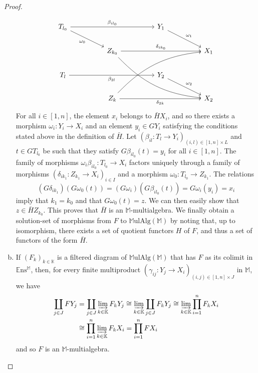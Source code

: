 \documentclass{article}
\newcommand{\bb}[1]{{\mathbb{#1}}}
\newcommand{\Set}{\mathbb{E}\mathrm{ns}}
\newcommand{\MulAlg}{\mathbb{M}\mathrm{ulAlg}}
\newcommand{\oldpage}[1]{\marginpar{\footnotesize$\Big\vert$ \textit{p.~#1}}}
\begin{document}
\begin{proof}
\begin{enumerate}[a)]
\oldpage{198}
      \[
        \begin{tikzcd}[column sep=huge]
          T_{l_0} \ar[rr,"\beta_{il_0}"] \ar[dr,swap,"\omega_0"]
          && Y_1 \ar[dr,"\omega_1"]
        \\&Z_{k_0} \ar[rr,"\delta_{ik_0}"] \ar[ddrr,bend right=20]
          && X_1
        \\T_l \ar[rr,swap,"\beta_{2l}"]
          && Y_2 \ar[dr,"\omega_2"]
        \\&Z_k \ar[rr,swap,"\delta_{2k}"] \ar[uurr,bend left=20]
          && X_2
        \end{tikzcd}
      \]
      For all $i\in[1,n]$, the element $x_i$ belongs to $\bar{H}X_i$, and so there exists a morphism $\omega_i\colon Y_i\to X_i$ and an element $y_i\in GY_i$ satisfying the conditions stated above in the definition of $\bar{H}$.
      Let $(\beta_{il}\colon T_l\to Y_i)_{(i,l)\in[1,n]\times L}$ and $t\in GT_{l_0}$ be such that they satisfy $G\beta_{il_0}(t)=y_i$ for all $i\in[1,n]$.
      The family of morphisms $\omega_i\beta_{il_0}\colon T_{l_0}\to X_i$ factors uniquely through a family of morphisms $(\delta_{ik_1}\colon Z_{k_1}\to X_i)_{i\in I}$ and a morphism $\omega_0\colon T_{l_0}\to Z_{k_1}$.
      The relations
      \[
        (G\delta_{ik_1})(G\omega_0(t))
        = (G\omega_i)(G\beta_{il_0}(t))
        = G\omega_i(y_i)
        = x_i
      \]
      imply that $k_1=k_0$ and that $G\omega_0(t)=z$.
      We can then easily show that $z\in\bar{H}Z_{k_0}$.
      This proves that $\bar{H}$ is an $\bb{M}$-multialgebra.
      We finally obtain a solution-set of morphisms from $F$ to $\MulAlg(\bb{M})$ by noting that, up to isomorphism, there exists a set of quotient functors $H$ of $F$, and thus a set of functors of the form $\bar{H}$.
    \item If $(F_k)_{k\in\bb{K}}$ is a filtered diagram of $\MulAlg(\bb{M})$ that has $F$ as its colimit in $\Set^\bb{M}$, then, for every finite multiproduct $(\gamma_{ij}\colon Y_j\to X_i)_{(i,j)\in[1,n]\times J}$ in $\bb{M}$, we have
      \[
        \begin{aligned}
          \coprod_{j\in J} FY_j
          &= \coprod_{j\in J} \varinjlim_{k\in\bb{K}} F_kY_j
          \cong \varinjlim_{k\in\bb{K}} \coprod_{j\in J} F_kY_j
          \cong \varinjlim_{k\in\bb{K}} \prod_{i=1}^n F_kX_i
        \\&\cong \prod_{i=1}^n \varinjlim_{k\in\bb{K}} F_kX_i
          = \prod_{i=1}^n FX_i
        \end{aligned}
      \]
      and so $F$ is an $\bb{M}$-multialgebra.

\end{enumerate}
\end{proof}
\end{document}
